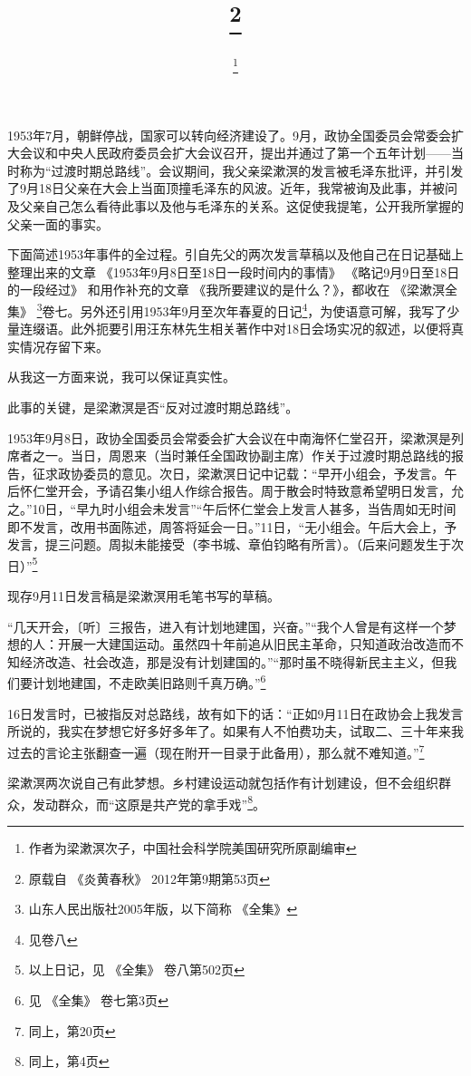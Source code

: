 \documentclass[a4paper,punct=kaiming]{ctexart}
\title{\titleContent\footnote{原载自 《炎黄春秋》 2012年第9期第53页}}
\author{\authorContent\footnote{作者为梁漱溟次子，中国社会科学院美国研究所原副编审}}
\date{}
\begin{document}
\maketitle

1953年7月，朝鲜停战，国家可以转向经济建设了。9月，政协全国委员会常委会扩大会议和中央人民政府委员会扩大会议召开，提出并通过了第一个五年计划——当时称为“过渡时期总路线”。会议期间，我父亲梁漱溟的发言被毛泽东批评，并引发了9月18日父亲在大会上当面顶撞毛泽东的风波。近年，我常被询及此事，并被问及父亲自己怎么看待此事以及他与毛泽东的关系。这促使我提笔，公开我所掌握的父亲一面的事实。

下面简述1953年事件的全过程。引自先父的两次发言草稿以及他自己在日记基础上整理出来的文章 《1953年9月8日至18日一段时间内的事情》 《略记9月9日至18日的一段经过》 和用作补充的文章 《我所要建议的是什么？》，都收在 《梁漱溟全集》 \footnote{山东人民出版社2005年版，以下简称 《全集》}卷七。另外还引用1953年9月至次年春夏的日记\footnote{见卷八}，为使语意可解，我写了少量连缀语。此外扼要引用汪东林先生相关著作中对18日会场实况的叙述，以便将真实情况存留下来。

从我这一方面来说，我可以保证真实性。

此事的关键，是梁漱溟是否“反对过渡时期总路线”。

1953年9月8日，政协全国委员会常委会扩大会议在中南海怀仁堂召开，梁漱溟是列席者之一。当日，周恩来（当时兼任全国政协副主席）作关于过渡时期总路线的报告，征求政协委员的意见。次日，梁漱溟日记中记载：“早开小组会，予发言。午后怀仁堂开会，予请召集小组人作综合报告。周于散会时特致意希望明日发言，允之。”10日，“早九时小组会未发言”“午后怀仁堂会上发言人甚多，当告周如无时间即不发言，改用书面陈述，周答将延会一日。”11日，“无小组会。午后大会上，予发言，提三问题。周拟未能接受（李书城、章伯钧略有所言）。（后来问题发生于次日）”\footnote{以上日记，见 《全集》 卷八第502页}

现存9月11日发言稿是梁漱溟用毛笔书写的草稿。

“几天开会，〔听〕三报告，进入有计划地建国，兴奋。”“我个人曾是有这样一个梦想的人：开展一大建国运动。虽然四十年前追从旧民主革命，只知道政治改造而不知经济改造、社会改造，那是没有计划建国的。”“那时虽不晓得新民主主义，但我们要计划地建国，不走欧美旧路则千真万确。”\footnote{见 《全集》 卷七第3页}

16日发言时，已被指反对总路线，故有如下的话：“正如9月11日在政协会上我发言所说的，我实在梦想它好多好多年了。如果有人不怕费功夫，试取二、三十年来我过去的言论主张翻查一遍（现在附开一目录于此备用），那么就不难知道。”\footnote{同上，第20页}

梁漱溟两次说自己有此梦想。乡村建设运动就包括作有计划建设，但不会组织群众，发动群众，而“这原是共产党的拿手戏”\footnote{同上，第4页}。
\end{document}
